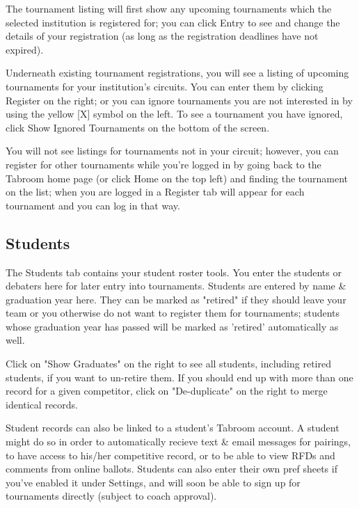 \documentclass[12pt]{report}
\begin{document}
		The tournament listing will first show any upcoming tournaments which
		the selected institution is registered for;  you can click Entry to see
		and change the details of your registration (as long as the
		registration deadlines have not expired). 

		Underneath existing tournament registrations, you will see a listing of
		upcoming tournaments for your institution's circuits.  You can enter
		them by clicking Register on the right; or you can ignore tournaments
		you are not interested in by using the yellow [X] symbol on the left.
		To see a tournament you have ignored, click Show Ignored Tournaments on
		the bottom of the screen.
		
		You will not see listings for tournaments not in your circuit; however,
		you can register for other tournaments while you're logged in by going
		back to the Tabroom home page (or click Home on the top left) and
		finding the tournament on the list; when you are logged in a Register
		tab will appear for each tournament and you can log in that way.

	\subsection{Students}

		The Students tab contains your student roster tools.  You enter the
		students or debaters here for later entry into tournaments.  Students
		are entered by name \& graduation year here.  They can be marked as
		"retired" if they should leave your team or you otherwise do not want
		to register them for tournaments; students whose graduation year has
		passed will be marked as 'retired' automatically as well.

		Click on "Show Graduates" on the right to see all students, including
		retired students, if you want to un-retire them.   If you should end up
		with more than one record for a given competitor, click on
		"De-duplicate" on the right to merge identical records.

		Student records can also be linked to a student's Tabroom account.  A
		student might do so in order to automatically recieve text \& email
		messages for pairings, to have access to his/her competitive record, or
		to be able to view RFDs and comments from online ballots.  Students can
		also enter their own pref sheets if you've enabled it under Settings,
		and will soon be able to sign up for tournaments directly (subject to
		coach approval).
\end{document}
